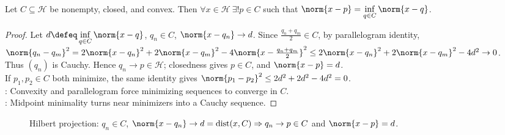 \begin{theorem} \label{thm:hilbert-projection-theorem} \\
Let $C\subseteq\mathcal{H}$ be nonempty, closed, and convex. Then $\forall x\in\mathcal{H}\ \exists!p\in C$ such that $\norm{x-p}=\inf\limits_{q\in C}\norm{x-q}$.
\begin{proof} Let $d\defeq\inf\limits_{q\in C}\norm{x-q}$, $q_n\in C$, $\norm{x-q_n}\to d$. Since $\frac{q_n+q_m}{2}\in C$, by parallelogram identity,\\
$\norm{q_n-q_m}^2=2\norm{x-q_n}^2+2\norm{x-q_m}^2-4\norm{x-\frac{q_n+q_m}{2}}^2\leq2\norm{x-q_n}^2+2\norm{x-q_m}^2-4d^2\to0$.\\
Thus $(q_n)$ is Cauchy. Hence $q_n\to p\in\mathcal H$; closedness gives $p\in C$, and $\norm{x-p}=d$.\\
If $p_1,p_2\in C$ both minimize, the same identity gives $\norm{p_1-p_2}^2\leq2d^2+2d^2-4d^2=0$.\\
: Convexity and parallelogram force minimizing sequences to converge in $C$.\\
: Midpoint minimality turns near minimizers into a Cauchy sequence.
\end{proof}
\end{theorem}

\begin{figure}[H]
  \centering
  
  \caption{Hilbert projection: $q_n\in C$, $\norm{x-q_n}\to d=\operatorname{dist}(x,C)\Rightarrow q_n\to p\in C$ and $\norm{x-p}=d$.}
  \label{fig:hilbert-best-approximation-convex-set}
\end{figure}

